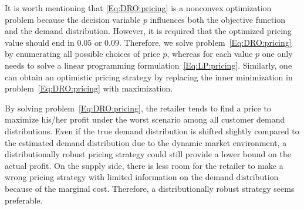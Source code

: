 \documentclass[competition,nonblindrev, 12pt]{informs3-competition}
\theoremstyle{TH}%
\theoremstyle{TH}%
\begin{document}
It is worth mentioning that \eqref{Eq:DRO:pricing} is a nonconvex optimization problem because the decision variable $p$ influences both the objective function and the demand distribution.
However, it is required that the optimized pricing value should end in $0.05$ or $0.09$.
Therefore, we solve problem~\eqref{Eq:DRO:pricing} by enumerating all possible choices of price $p$, whereas for each value $p$ one only needs to solve a linear programming formulation~\eqref{Eq:LP:pricing}.
Similarly, one can obtain an optimistic pricing strategy by replacing the inner minimization in problem~\eqref{Eq:DRO:pricing} with maximization.

\begin{remark}
By solving problem~\eqref{Eq:DRO:pricing}, the retailer tends to find a price to maximize his/her profit under the worst scenario among all customer demand distributions. 
Even if the true demand distribution is shifted slightly compared to the estimated demand distribution due to the dynamic market environment, a distributionally robust pricing strategy could still provide a lower bound on the actual profit.
On the supply side, there is less room for the retailer to make a wrong pricing strategy with limited information on the demand distribution because of the marginal cost.
Therefore, a distributionally robust strategy seems preferable.
\end{remark}

\vspace{-1em}
\end{document}
